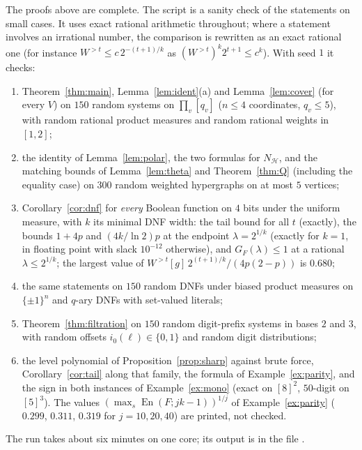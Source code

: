\documentclass[11pt,reqno]{amsart}
\theoremstyle{definition}
\newcommand{\energy}{\operatorname{En}}
\newcommand{\Ho}{\mathcal H}
\begin{document}
The proofs above are complete.  The script
 is a sanity check of the statements on small cases.  It uses exact rational
arithmetic throughout; where a statement involves an irrational number, the
comparison is rewritten as an exact rational one (for instance
$W^{>t}\le c\,2^{-(t+1)/k}$ as $(W^{>t})^k2^{t+1}\le c^k$).  With seed $1$ it checks:
\begin{enumerate}
\item[(A)] Theorem~\ref{thm:main}, Lemma~\ref{lem:ident}(a) and
Lemma~\ref{lem:cover} (for every $V$) on $150$ random systems on
$\prod_v[q_v]$ ($n\le4$ coordinates, $q_v\le5$), with random rational product measures
and random rational weights in $[1,2]$;
\item[(B)] the identity of Lemma~\ref{lem:polar}, the two formulas for $N_\Ho$, and
the matching bounds of Lemma~\ref{lem:theta} and Theorem~\ref{thm:Q}
(including the equality case) on $300$ random weighted hypergraphs on at most
$5$ vertices;
\item[(C)] Corollary~\ref{cor:dnf} for \emph{every} Boolean function on $4$ bits
under the uniform measure, with $k$ its minimal DNF width: the tail bound for
all $t$ (exactly), the bounds $1+4p$ and $(4k/\ln2)p$ at the endpoint
$\lambda=2^{1/k}$ (exactly for $k=1$, in floating point with slack $10^{-12}$
otherwise), and $G_F(\lambda)\le1$ at a rational $\lambda\le2^{1/k}$; the largest value
of $W^{>t}[g]\,2^{(t+1)/k}/(4p(2-p))$ is $0.680$;
\item[(D)] the same statements on $150$ random DNFs under biased product
measures on $\{\pm1\}^n$ and $q$-ary DNFs with set-valued literals;
\item[(E)] Theorem~\ref{thm:filtration} on $150$ random digit-prefix systems in
bases $2$ and $3$, with random offsets $i_0(\ell)\in\{0,1\}$ and random digit
distributions;
\item[(F)] the level polynomial of Proposition~\ref{prop:sharp} against brute
force, Corollary~\ref{cor:tail} along that family, the formula of
Example~\ref{ex:parity}, and the sign in both instances of
Example~\ref{ex:mono} (exact on $[8]^2$, $50$-digit on $[5]^3$).  The
values $(\max_s\energy(F;jk-1))^{1/j}$ of Example~\ref{ex:parity} ($0.299$, $0.311$,
$0.319$ for $j=10,20,40$) are printed, not checked.
\end{enumerate}
The run takes about six minutes on one core; its output is in the file
.
\end{document}
